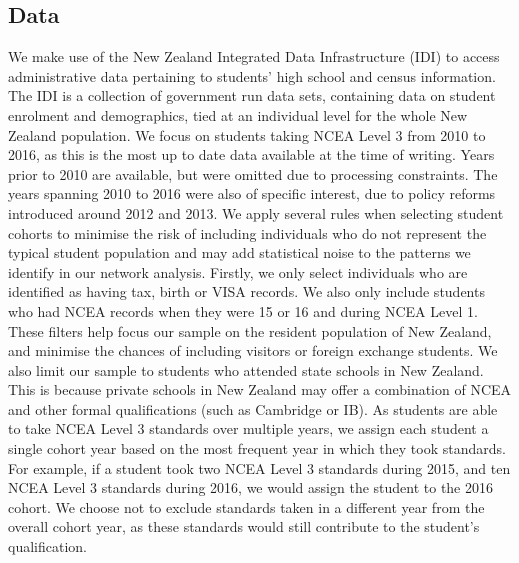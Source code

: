 \documentclass[a4paper]{article}
\begin{document}
\subsection{Data}
We make use of the New Zealand Integrated Data Infrastructure (IDI) to access administrative data pertaining to students' high school and census information. The IDI is a collection of government run data sets, containing data on student enrolment and demographics, tied at an individual level for the whole New Zealand population. We focus on students taking NCEA Level 3 from 2010 to 2016, as this is the most up to date data available at the time of writing. Years prior to 2010 are available, but were omitted due to processing constraints. The years spanning 2010 to 2016 were also of specific interest, due to policy reforms introduced around 2012 and 2013. We apply several rules when selecting student cohorts to minimise the risk of including individuals who do not represent the typical student population and may add statistical noise to the patterns we identify in our network analysis. Firstly, we only select individuals who are identified as having tax, birth or VISA records. We also only include students who had NCEA records when they were 15 or 16 and during NCEA Level 1. These filters help focus our sample on the resident population of New Zealand, and minimise the chances of including visitors or foreign exchange students. We also limit our sample to students who attended state schools in New Zealand. This is because private schools in New Zealand may offer a combination of NCEA and other formal qualifications (such as Cambridge or IB). As students are able to take NCEA Level 3 standards over multiple years, we assign each student a single cohort year based on the most frequent year in which they took standards. For example, if a student took two NCEA Level 3 standards during 2015, and ten NCEA Level 3 standards during 2016, we would assign the student to the 2016 cohort. We choose not to exclude standards taken in a different year from the overall cohort year, as these standards would still contribute to the student's qualification.
\end{document}

